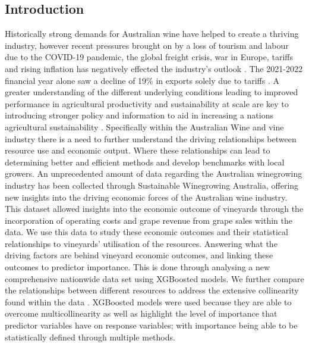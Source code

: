 \documentclass[review,12pt,authoryear]{elsarticle}
\begin{document}
\begin{linenumbers}
\section{Introduction}

Historically strong demands for Australian wine have helped to create a thriving industry, however recent pressures brought on by a loss of tourism and labour due to the COVID-19 pandemic, the global freight crisis, war in Europe, tariffs and rising inflation has negatively effected the industry's outlook \citep{wineaustraliaNationalVintageReport2021,wineaustraliaAustralianWineProduction2021}. The 2021-2022 financial year alone saw a decline of 19\% in exports solely due to tariffs \citep{wineaustraliaNationalVintageReport2022}. A greater understanding of the different underlying conditions leading to improved performance in agricultural productivity and sustainability at scale are key to  introducing stronger policy and information to aid in increasing a nations agricultural sustainability \citep{oecdInnovationProductivitySustainability2019}. Specifically within the Australian Wine and vine industry there is a need to further understand the driving relationships between resource use and economic output. Where these relationships can lead to determining better and efficient methods and develop benchmarks with local growers. \citep{lukemanciniUnderstandingAustralianWine2020}
\newline
An unprecedented amount of data regarding the Australian winegrowing industry has been collected through Sustainable Winegrowing Australia, offering new insights into the driving economic forces of the Australian wine industry. This dataset allowed insights into the economic outcome of vineyards through the incorporation of operating costs and grape revenue from grape sales within the data. We use this data to study these economic outcomes and their statistical relationships to vineyards' utilisation of the resources. Answering what the driving factors are behind vineyard economic outcomes, and linking these outcomes to predictor importance. This is done through analysing a new comprehensive nationwide data set using XGBoosted models. We further compare the relationships between different resources to address the extensive collinearity found within the data \citep{chenXGBoostScalableTree2016}. XGBoosted models were used because they are able to overcome multicollinearity as well as highlight the level of importance that predictor variables have on response variables; with importance being able to be statistically defined through multiple methods.


\end{linenumbers}
\end{document}
